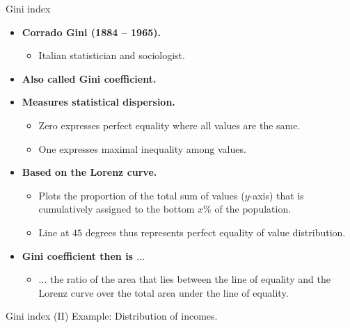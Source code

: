 \documentclass[aspectratio=169,t,table]{beamer}
\begin{document}
  {
    \begin{frame}{Gini index}
      \begin{itemize}
        \item \textbf{Corrado Gini (1884 -- 1965).}
        \begin{itemize}
          \item Italian statistician and sociologist.
        \end{itemize}
        \item \textbf{Also called Gini coefficient.}
        \item \textbf{Measures statistical dispersion.}
        \begin{itemize}
          \item Zero expresses perfect equality where all values are the same.
          \item One expresses maximal inequality among values.
        \end{itemize}
        \item \textbf{Based on the Lorenz curve.}
        \begin{itemize}
          \item Plots the proportion of the total sum of values ($y$-axis) that is cumulatively assigned to the bottom $x\%$ of the population.
          \item Line at $45$ degrees thus represents perfect equality of value distribution.
        \end{itemize}
        \item \textbf{Gini coefficient then is $\ldots$}
        \begin{itemize}
          \item $\ldots$ the ratio of the area that lies between the line of equality and the Lorenz curve over the total area under the line of equality.
        \end{itemize}
      \end{itemize}
    \end{frame}
  }

  {
    \begin{frame}{Gini index (II)}
      \centering
      Example: Distribution of incomes.\\[0.5cm]
    \end{frame}
  }
\end{document}
